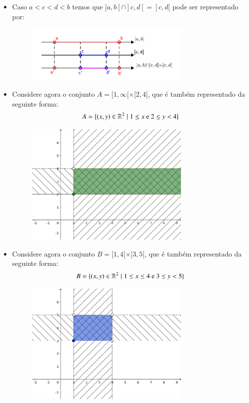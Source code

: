 \begin{itemize}
   \item Caso $a< c< d< b$ temos que $]a, b[ \cap ]c, d[= ]c, d[$ pode ser representado por:
  \begin{figure}[H]
 \centering
 \includegraphics[width=8cm]{../Topicos/Figuras/intersecaoa-c-db.pdf}
 \end{figure}
 
 \item Considere agora o conjunto $A= [1, \infty[ \times [2, 4[$, que é também representado da seguinte forma:
 \[A= \{(x, y) \in \mathbb{R}^2 \mid 1 \leq x \text{ e } 2 \leq y < 4 \}\]
   \begin{figure}[H]
 \centering
 \includegraphics[width=8cm]{../Topicos/Figuras/cartesiano1infty24.pdf}
 \end{figure}
 
 \item Considere agora o conjunto $B= [1, 4[ \times [3, 5[$, que é também representado da seguinte forma:
 \[B= \{(x, y) \in \mathbb{R}^2 \mid 1 \leq x \leq 4 \text{ e } 3 \leq y < 5 \}\]
   \begin{figure}[H]
 \centering
 \includegraphics[width=8cm]{../Topicos/Figuras/cartesiano1435.pdf}
 \end{figure}
 

\end{itemize}
